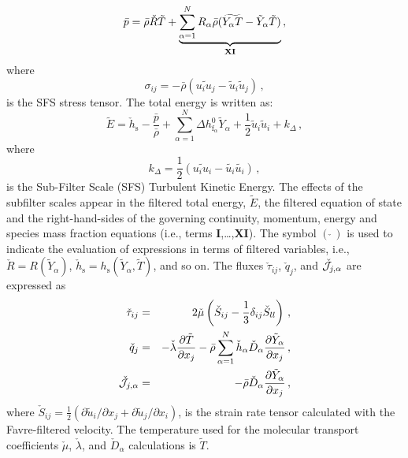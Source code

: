 \begin{equation} 
  \label{eq:filt_eq_state} 
  \bar{p} = \bar{\rho} \check{R} \tilde{T} 
  + \underbrace{ \sum_{\alpha=1}^N R_\alpha \bar{\rho}
    (\widetilde{Y_\alpha T} - \tilde{Y}_\alpha \tilde{T}) }_{\bf XI} \,,
\end{equation}
%
%
where
%
\begin{equation}
  \label{eq:sfs_stresses}
  \sigma_{ij} = - \bar{\rho} \left( \widetilde{u_i u_j} - \tilde{u}_i \tilde{u}_j \right) \,, 
\end{equation}
%                     
is the SFS stress tensor. The total energy is written as:
%
\begin{equation}
  \tilde{E} = \check{h}_{\mathrm{s}} - \frac{\bar{p}}{\bar{\rho}} 
  + \sum_{\alpha=1}^N \Delta h^0_{\mathrm{f}_\alpha} \tilde{Y}_\alpha 
  + \frac{1}{2}\tilde{u}_i \tilde{u}_i + k_\Delta \,,
\end{equation}
%
where
% 
\begin{equation}
  k_\Delta = \frac{1}{2} \left( \widetilde{u_i u_i} - \tilde{u_i}\tilde{u_i} \right) \,,
\end{equation}
%
is the Sub-Filter Scale (SFS) Turbulent Kinetic Energy. The effects of the subfilter scales appear in the filtered total energy, $\tilde{E}$, the filtered
equation of state and the right-hand-sides of the governing continuity, momentum, energy and species mass fraction equations (i.e., terms \textbf{I},\ldots,\textbf{XI}). The symbol $(\,\check{}\,)$ is used to indicate the evaluation of expressions in terms of filtered variables, i.e.,
$\check{R}\!=\!R(\tilde{Y}_\alpha)$,
$\check{h}_{\mathrm{s}}\!=\!h_{\mathrm{s}}(\tilde{Y}_\alpha,\tilde{T})$,
and so on. The fluxes $\check{\tau}_{ij}$, $\check{q}_j$, and
$\check{\cal J}_{j,\alpha}$ are expressed as
%
\begin{eqnarray}
  \check{\tau}_{ij} & = &  2 \check{\mu} \left( \check{S}_{ij} - 
  \frac{1}{3} \delta_{ij}\check{S}_{ll} \right) \,,  \\
%
  \check{q}_j & = &  - \check{\lambda} \frac{\partial \tilde{T}}{\partial x_j} 
  - \bar{\rho} \sum_{\alpha=1}^N \check{h}_\alpha \check{D}_\alpha \frac{\partial \tilde{Y}_\alpha}{\partial x_j} \,, \\
%
  \check{\cal J}_{j,\alpha} & = &  - \bar{\rho} \check{D}_\alpha \frac{\partial \tilde{Y}_\alpha}{\partial x_j} \,,
\end{eqnarray}
%
where 
%
$\check{S}_{ij} \!=\! \frac{1}{2} \left(\partial \tilde{u}_{i}/\partial
  x_{j} + \partial \tilde{u}_j/ \partial x_i \right)$, is the strain rate tensor calculated with the Favre-filtered velocity.  The temperature used for the molecular transport coefficients $\check{\mu}$, $\check{\lambda}$, and $\check{D}_\alpha$ calculations is $\tilde{T}$.

